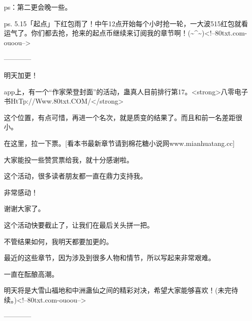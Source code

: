 \begin{this_body}
ps：第二更会晚一些。

ps. 5.15「起点」下红包雨了！中午12点开始每个小时抢一轮，一大波515红包就看运气了。你们都去抢，抢来的起点币继续来订阅我的章节啊！(\~{}\^{}\~{})<!--80txt.com-ouoou-->

------------

明天加更！

app上，有一个“作家荣登封面”的活动，蛊真人目前排行第17。<strong>八零电子书HtTp://Www.80txt.COM/</strong>

这个位置，有点可惜，再进一个名次，就是质变的结果了。而且和前一名差距很小。

在这里，拉一下票。[看本书最新章节请到棉花糖小说网www.mianhuatang.cc]

大家能投一些赞赏票给我，就十分感谢啦。

这个活动，很多读者朋友都一直在鼎力支持我。

非常感动！

谢谢大家了。

这个活动快要截止了，让我们在最后关头拼一把。

不管结果如何，我明天都要加更的。

最近的这些章节，因为涉及到很多人物和情节，所以写起来非常艰难。

一直在酝酿高潮。

明天将是大雪山福地和中洲蛊仙之间的精彩对决，希望大家能够喜欢！(未完待续。)<!--80txt.com-ouoou-->

------------

\end{this_body}

